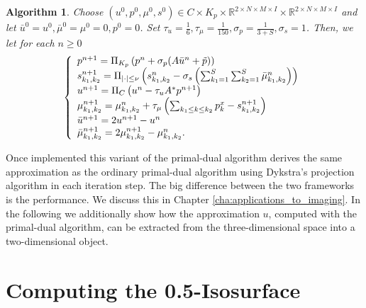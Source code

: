 \documentclass[abstracton]{scrreprt}
\newtheorem{algorithm}[theorem]{Algorithm}
\begin{document}
            \begin{algorithm}
                \label{alg:mumford_shah_lagrange_multiplier}
                Choose $(u^{0}, p^{0}, \mu^{0}, s^{0}) \in C \times K_{p} \times \mathbb{R}^{2 \times N \times M \times I} \times \mathbb{R}^{2 \times N \times M \times I}$ and let $\bar{u}^{0} = u^{0}, \bar{\mu}^{0} = \mu^{0} = 0, p^{0} = 0$. Set $\tau_{u} = \frac{1}{6}, \tau_{\mu} = \frac{1}{150}, \sigma_{p} = \frac{1}{3 + S}, \sigma_{s} = 1$. Then, we let for each $n \ge 0$
                    \begin{equation}
                        \left\{ 
                            \begin{array}{l l}
                              p^{n+1} = \Pi_{K_{p}} \left(p^{n} + \sigma_{p} (A \bar{u}^{n} + \tilde{p})\right) \\
                              s_{k_{1}, k_{2}}^{n+1} = \Pi_{|\cdot| \le \nu} \left(s_{k_{1}, k_{2}}^{n} - \sigma_{s} \left( \sum_{k_{1} = 1}^{S} \sum_{k_{2} = 1}^{S} \bar{\mu}_{k_{1}, k_{2}}^{n} \right) \right) \\
                              u^{n+1} = \Pi_{C} \left(u^{n} - \tau_{u} A^{*} p^{n+1} \right) \\
                              \mu_{k_{1}, k_{2}}^{n+1} = \mu_{k_{1}, k_{2}}^{n} + \tau_{\mu} \left( \sum_{k_{1} \le k \le k_{2}} p^{x}_{k} - s_{k_{1}, k_{2}}^{n+1} \right) \\
                              \bar{u}^{n+1} = 2u^{n+1} - u^{n} \\
                              \bar{\mu}_{k_{1}, k_{2}}^{n+1} = 2\mu_{k_{1}, k_{2}}^{n+1} - \mu_{k_{1}, k_{2}}^{n}.
                            \end{array}
                        \right.
                    \end{equation}
            \end{algorithm}
        Once implemented this variant of the primal-dual algorithm derives the same approximation as the ordinary primal-dual algorithm using Dykstra's projection algorithm in each iteration step. The big difference between the two frameworks is the performance. We discuss this in Chapter \ref{cha:applications_to_imaging}. In the following we additionally show how the approximation $u$, computed with the primal-dual algorithm, can be extracted from the three-dimensional space into a two-dimensional object.
    \section{Computing the 0.5-Isosurface} %
    \label{sec:computing_the_0_5_isosurface}
\end{document}

